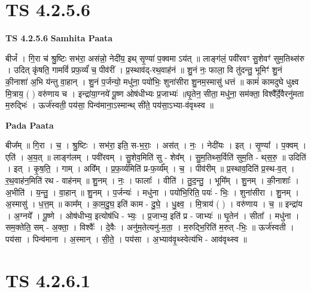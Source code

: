 \documentclass[17pt]{extarticle}
\begin{document}

\section{ TS 4.2.5.6 }

\textbf{TS 4.2.5.6 } \newline
\textbf{Samhita Paata} \newline

बीजं᳚ । गि॒रा च॑ श्रु॒ष्टिः सभ॑रा॒ अस॑न्नो॒ नेदी॑य॒ इथ् सृ॒ण्या॑ प॒क्वमा ऽय॑त् ॥ लाङ्ग॑लं॒ पवी॑रवꣳ सु॒शेवꣳ॑ सुम॒तिथ्स॑रु । उदित् कृ॑षति॒ गामविं॑ प्रफ॒र्व्यं॑ च॒ पीव॑रीं । प्र॒स्थाव॑द्-रथ॒वाह॑नं ॥ शु॒नं नः॒ फाला॒ वि तु॑दन्तु॒ भूमिꣳ॑ शु॒नं की॒नाशा॑ अ॒भि य॑न्तु वा॒हान् । शु॒नं प॒र्जन्यो॒ मधु॑ना॒ पयो॑भिः॒ शुना॑सीरा शु॒नम॒स्मासु॑ धत्तं ॥ कामं॑ कामदुघे धुक्ष्व मि॒त्राय॒ ( ) वरु॑णाय च । इन्द्रा॑या॒ग्नये॑ पू॒ष्ण ओष॑धीभ्यः प्र॒जाभ्यः॑ ॥घृ॒तेन॒ सीता॒ मधु॑ना॒ सम॑क्ता॒ विश्वै᳚र्दे॒वैरनु॑मता म॒रुद्भिः॑ । ऊर्ज॑स्वती॒ पय॑सा॒ पिन्व॑माना॒ऽस्मान्थ् सी॑ते॒ पय॑सा॒ऽभ्या-व॑वृथ्स्व ॥ \newline

\textbf{Pada Paata} \newline

बीज᳚म् ॥ गि॒रा । च॒ । श्रु॒ष्टिः । सभ॑रा॒ इति॒ स-भ॒राः॒ । अस॑त् । नः॒ । नेदी॑यः । इत् । सृ॒ण्या᳚ । प॒क्वम् । एति॑ । अ॒य॒त् ॥ लाङ्ग॑लम् । पवी॑रवम् । सु॒शेव॒मिति॑ सु - शेव᳚म् । सु॒म॒तिथ्स॒र्विति॑ सुम॒ति - थ्‌स॒रु॒ ॥ उदिति॑ । इत् । कृ॒ष॒ति॒ । गाम् । अवि᳚म् । प्र॒फ॒र्व्य॑मिति॑ प्र-फ॒र्व्य᳚म् । च॒ । पीव॑रीम् ॥ प्र॒स्थाव॒दिति॑ प्र॒स्थ-व॒त् । र॒थ॒वाह॑न॒मिति॑ रथ - वाह॑नम् ॥ शु॒नम् । नः॒ । फालाः᳚ । वीति॑ । तु॒द॒न्तु॒ । भूमि᳚म् । शु॒नम् । की॒नाशाः᳚ । अ॒भीति॑ । य॒न्तु॒ । वा॒हान् ॥ शु॒नम् । प॒र्जन्यः॑ । मधु॑ना । पयो॑भि॒रिति॒ पयः॑ - भिः॒ । शुना॑सीरा । शु॒नम् । अ॒स्मासु॑ । ध॒त्त॒म् ॥ काम᳚म् । का॒म॒दु॒घ॒ इति॑ काम - दु॒घे॒ । धु॒क्ष्व॒ । मि॒त्राय॑ ( ) । वरु॑णाय । च॒ ॥ इन्द्रा॑य । अ॒ग्नये᳚ । पू॒ष्णे । ओष॑धीभ्य॒ इत्योष॑धि - भ्यः॒ । प्र॒जाभ्य॒ इति॑ प्र - जाभ्यः॑ ॥ घृ॒तेन॑ । सीता᳚ । मधु॑ना । सम॒क्तेति॒ सम् - अ॒क्ता॒ । विश्वैः᳚ । दे॒वैः । अनु॑म॒तेत्यनु॑-म॒ता॒ । म॒रुद्भि॒रिति॑ म॒रुत् -भिः॒ ॥ ऊर्ज॑स्वती । पय॑सा । पिन्व॑माना । अ॒स्मान् । सी॒ते॒ । पय॑सा । अ॒भ्याव॑वृ॒थ्स्वेत्य॑भि - आव॑वृथ्स्व ॥  \newline





\section{ TS 4.2.6.1 }
\end{document}
